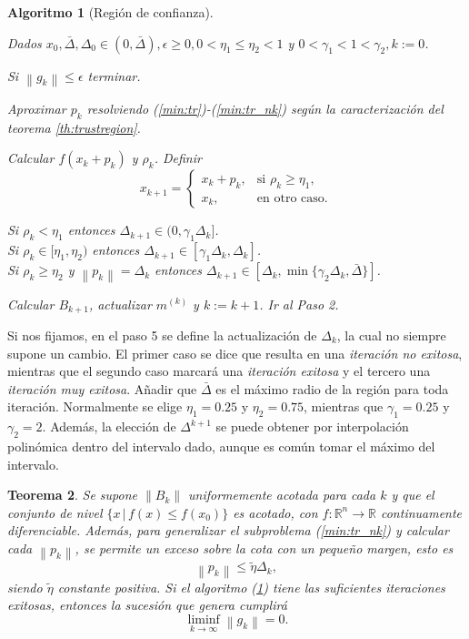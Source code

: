 \documentclass[11pt,a4paper]{book}
\newtheorem{theorem}{Teorema}[chapter]
\newtheorem{algorithm}[theorem]{Algoritmo}
\theoremstyle{definition}
\theoremstyle{remark}
\newcommand{\norm}[1]{\left\lVert#1\right\rVert}
\begin{document}
\begin{algorithm}[Región de confianza] \leavevmode
	\label{alg:tr}
	\begin{steps}
		\item Dados $x_0, \bar{\Delta}, \Delta_0 \in (0, \bar{\Delta}), \epsilon \geq
			0, 0<\eta_1\leq\eta_2<1$ y $0<\gamma_1<1<\gamma_2, k:=0$.
		\item Si $\norm{g_k} \leq \epsilon$ terminar.
		\item Aproximar $p_k$ resolviendo (\ref{min:tr})-(\ref{min:tr_nk}) según la caracterización del teorema \ref{th:trustregion}.
		\item Calcular $f(x_k+p_k)$ y $\rho_k$. Definir
			\begin{equation*}
				x_{k+1} = \begin{cases}
					x_k + p_k, & \text{si } \rho_k \geq \eta_1, \\
					x_k, & \text{en otro caso.}
				\end{cases}
			\end{equation*}
		\item Si $\rho_k < \eta_1$ entonces $\Delta_{k+1} \in (0,\gamma_1 \Delta_k]$. \\
			Si $\rho_k \in [\eta_1, \eta_2)$ entonces $\Delta_{k+1} \in [\gamma_1 \Delta_k,\Delta_k]$. \\
			Si $\rho_k \geq \eta_2$ y $\norm{p_k}=\Delta_k$ entonces
			$\Delta_{k+1} \in [\Delta_k, \min \{\gamma_2 \Delta_k,\bar{\Delta}\}]$.
		\item Calcular $B_{k+1}$, actualizar $m^{(k)}$ y $k:=k+1$. Ir al Paso 2.
	\end{steps}
\end{algorithm}
Si nos fijamos, en el paso 5 se define la actualización de $\Delta_k$, la cual no siempre supone un cambio.
El primer caso se dice que resulta en una \textit{iteración no exitosa}, mientras que el segundo caso marcará
una \textit{iteración exitosa} y el tercero una \textit{iteración muy exitosa}.
Añadir que $\bar \Delta$ es el máximo radio de la región para toda iteración.
Normalmente se elige $\eta_1 = 0.25$ y $\eta_2 = 0.75$, mientras que $\gamma_1 = 0.25$ y $\gamma_2 = 2$.
Además, la elección de $\Delta^{k+1}$ se puede obtener por interpolación polinómica dentro del
intervalo dado,
aunque es común tomar el máximo del intervalo.

\begin{theorem} \label{th:conv-tr}
Se supone $\norm{B_k}$ uniformemente acotada para cada $k$
y que el conjunto de nivel $\{x\,|\,f(x)\leq f(x_0)\}$ es acotado, con $f: \mathbb{R}^n \to \mathbb{R}$
continuamente
diferenciable. Además, para generalizar el subproblema (\ref{min:tr_nk}) y calcular cada $\norm{p_k}$,
se permite
un exceso sobre la cota con un pequeño margen, esto es
\begin{equation}
	\norm{p_k} \leq \tilde{\eta} \Delta_k,
\end{equation}
siendo $\tilde{\eta}$ constante positiva.
Si el algoritmo (\ref{alg:tr}) tiene las suficientes iteraciones exitosas,
entonces la sucesión que genera cumplirá
\begin{equation}
	\liminf_{k\to \infty} \norm{g_k} = 0.
\end{equation}
\end{theorem}
\end{document}
